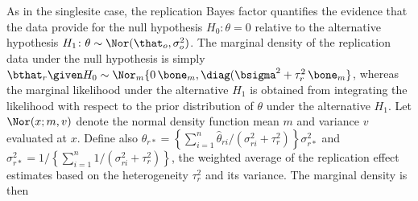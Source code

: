 \begin{subappendices}
As in the singlesite case, the replication Bayes factor quantifies the evidence
that the data provide for the null hypothesis $H_{0}\colon \theta = 0$ relative
to the alternative hypothesis
$H_{1} \colon \theta \sim \Nor(\that_{o}, \sigma^{2}_{o})$. The marginal density
of the replication data under the null hypothesis is simply
$\bthat_{r} \given H_{0} \sim \Nor_{m}\{0 \, \bone_{m}, \diag(\bsigma^{2} + \tau^{2}_{r} \, \bone_{m}\}$,
whereas the marginal likelihood under the alternative $H_{1}$ is obtained from
integrating the likelihood
with respect to the prior distribution of $\theta$ under the alternative
$H_{1}$. %
Let $\Nor(x;m,v)$ denote the normal density function mean $m$ and variance $v$
evaluated at $x$. Define also
$\hat{\theta}_{r*} = \left\{\sum_{i=1}^{n}\hat{\theta}_{ri}/(\sigma^{2}_{ri} + \tau^{2}_{r})\right\} \sigma^{2}_{r*}$
and
$\sigma^{2}_{r*} = 1/\left\{\sum_{i=1}^{n}1/(\sigma^{2}_{ri} + \tau^{2}_{r})\right\}$,
\ie{} the weighted average of the replication effect estimates based on the
heterogeneity $\tau^{2}_{r}$ and its variance. The marginal density is then


\end{subappendices}
